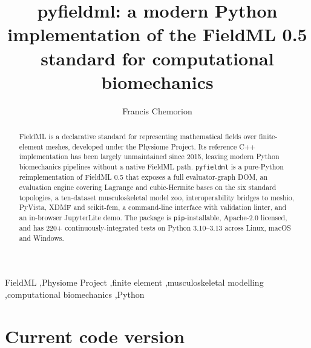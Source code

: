 \documentclass[preprint,12pt,a4paper]{elsarticle}
\begin{document}
\renewcommand{\labelenumii}{\arabic{enumi}.\arabic{enumii}}

\begin{frontmatter}

\title{pyfieldml: a modern Python implementation of the FieldML 0.5 standard for computational biomechanics}

\author[upf]{Francis Chemorion}

\address[upf]{BCN MedTech, Universitat Pompeu Fabra, Roc Boronat 138, 08018 Barcelona, Spain}

\begin{abstract}
FieldML is a declarative standard for representing mathematical fields over finite-element meshes, developed under the Physiome Project. Its reference C++ implementation has been largely unmaintained since 2015, leaving modern Python biomechanics pipelines without a native FieldML path. \texttt{pyfieldml} is a pure-Python reimplementation of FieldML 0.5 that exposes a full evaluator-graph DOM, an evaluation engine covering Lagrange and cubic-Hermite bases on the six standard topologies, a ten-dataset musculoskeletal model zoo, interoperability bridges to meshio, PyVista, XDMF and scikit-fem, a command-line interface with validation linter, and an in-browser JupyterLite demo. The package is \texttt{pip}-installable, Apache-2.0 licensed, and has 220+ continuously-integrated tests on Python 3.10--3.13 across Linux, macOS and Windows.
\end{abstract}

\begin{keyword}
FieldML \sep Physiome Project \sep finite element \sep musculoskeletal modelling \sep computational biomechanics \sep Python
\end{keyword}

\end{frontmatter}

\section*{Current code version}
\end{document}
